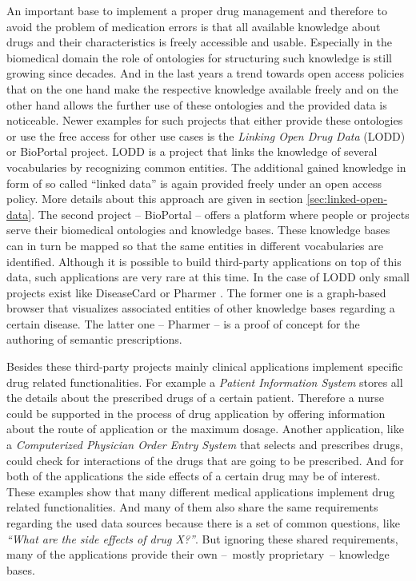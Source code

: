 An important base to implement a proper drug management and therefore to avoid the problem of medication errors is that all available knowledge about drugs and their characteristics is freely accessible and usable.
Especially in the biomedical domain the role of ontologies for structuring such knowledge is still growing since decades.
And in the last years a trend towards open access policies that on the one hand make the respective knowledge available freely and on the other hand allows the further use of these ontologies and the provided data is noticeable.
Newer examples for such projects that either provide these ontologies or use the free access for other use cases is the \textit{Linking Open Drug Data} (LODD) \cite{jentzsch2009linking} or BioPortal \cite{whetzel2011bioportal} project.
LODD is a project that links the knowledge of several vocabularies by recognizing common entities.
The additional gained knowledge in form of so called ``linked data'' is again provided freely under an open access policy.
More details about this approach are given in section \ref{sec:linked-open-data}.
The second project -- BioPortal -- offers a platform where people or projects serve their biomedical ontologies and knowledge bases.
These knowledge bases can in turn be mapped so that the same entities in different vocabularies are identified.
Although it is possible to build third-party applications on top of this data, such applications are very rare at this time.
In the case of LODD only small projects exist like DiseaseCard \cite{oliveira2004diseasecard} or Pharmer \cite{khalili2013pharmer}.
The former one is a graph-based browser that visualizes associated entities of other knowledge bases regarding a certain disease.
The latter one -- Pharmer -- is a proof of concept for the authoring of semantic prescriptions.

Besides these third-party projects mainly clinical applications implement specific drug related functionalities.
For example a \textit{Patient Information System} stores all the details about the prescribed drugs of a certain patient.
Therefore a nurse could be supported in the process of drug application by offering information about the route of application or the maximum dosage.
Another application, like a \textit{Computerized Physician Order Entry System} that selects and prescribes drugs, could check for interactions of the drugs that are going to be prescribed.
And for both of the applications the side effects of a certain drug may be of interest.
These examples show that many different medical applications implement drug related functionalities.
And many of them also share the same requirements regarding the used data sources because there is a set of common questions, like \textit{``What are the side effects of drug X?''}.
But ignoring these shared requirements, many of the applications provide their own --~mostly proprietary~-- knowledge bases.

